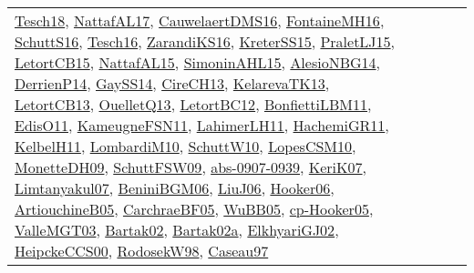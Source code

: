 {\begin{longtable}{lp{3cm}>{\raggedright}p{6cm}>{\raggedright}p{6cm}p{8cm}}
\href{papers/Tesch18.pdf}{Tesch18}\cite{Tesch18}, \href{articles/NattafAL17.pdf}{NattafAL17}\cite{NattafAL17}, \href{papers/CauwelaertDMS16.pdf}{CauwelaertDMS16}\cite{CauwelaertDMS16}, \href{papers/FontaineMH16.pdf}{FontaineMH16}\cite{FontaineMH16}, \href{papers/SchuttS16.pdf}{SchuttS16}\cite{SchuttS16}, \href{papers/Tesch16.pdf}{Tesch16}\cite{Tesch16}, \href{articles/ZarandiKS16.pdf}{ZarandiKS16}\cite{ZarandiKS16}, \href{papers/KreterSS15.pdf}{KreterSS15}\cite{KreterSS15}, \href{papers/PraletLJ15.pdf}{PraletLJ15}\cite{PraletLJ15}, \href{articles/LetortCB15.pdf}{LetortCB15}\cite{LetortCB15}, \href{articles/NattafAL15.pdf}{NattafAL15}\cite{NattafAL15}, \href{articles/SimoninAHL15.pdf}{SimoninAHL15}\cite{SimoninAHL15}, \href{papers/AlesioNBG14.pdf}{AlesioNBG14}\cite{AlesioNBG14}, \href{papers/DerrienP14.pdf}{DerrienP14}\cite{DerrienP14}, \href{papers/GaySS14.pdf}{GaySS14}\cite{GaySS14}, \href{papers/CireCH13.pdf}{CireCH13}\cite{CireCH13}, \href{papers/KelarevaTK13.pdf}{KelarevaTK13}\cite{KelarevaTK13}, \href{papers/LetortCB13.pdf}{LetortCB13}\cite{LetortCB13}, \href{papers/OuelletQ13.pdf}{OuelletQ13}\cite{OuelletQ13}, \href{papers/LetortBC12.pdf}{LetortBC12}\cite{LetortBC12}, \href{papers/BonfiettiLBM11.pdf}{BonfiettiLBM11}\cite{BonfiettiLBM11}, \href{papers/EdisO11.pdf}{EdisO11}\cite{EdisO11}, \href{papers/KameugneFSN11.pdf}{KameugneFSN11}\cite{KameugneFSN11}, \href{papers/LahimerLH11.pdf}{LahimerLH11}\cite{LahimerLH11}, \href{articles/HachemiGR11.pdf}{HachemiGR11}\cite{HachemiGR11}, \href{articles/KelbelH11.pdf}{KelbelH11}\cite{KelbelH11}, \href{papers/LombardiM10.pdf}{LombardiM10}\cite{LombardiM10}, \href{papers/SchuttW10.pdf}{SchuttW10}\cite{SchuttW10}, \href{articles/LopesCSM10.pdf}{LopesCSM10}\cite{LopesCSM10}, \href{papers/MonetteDH09.pdf}{MonetteDH09}\cite{MonetteDH09}, \href{papers/SchuttFSW09.pdf}{SchuttFSW09}\cite{SchuttFSW09}, \href{articles/abs-0907-0939.pdf}{abs-0907-0939}\cite{abs-0907-0939}, \href{papers/KeriK07.pdf}{KeriK07}\cite{KeriK07}, \href{papers/Limtanyakul07.pdf}{Limtanyakul07}\cite{Limtanyakul07}, \href{papers/BeniniBGM06.pdf}{BeniniBGM06}\cite{BeniniBGM06}, \href{papers/LiuJ06.pdf}{LiuJ06}\cite{LiuJ06}, \href{articles/Hooker06.pdf}{Hooker06}\cite{Hooker06}, \href{papers/ArtiouchineB05.pdf}{ArtiouchineB05}\cite{ArtiouchineB05}, \href{papers/CarchraeBF05.pdf}{CarchraeBF05}\cite{CarchraeBF05}, \href{papers/WuBB05.pdf}{WuBB05}\cite{WuBB05}, \href{papers/cp-Hooker05.pdf}{cp-Hooker05}\cite{cp-Hooker05}, \href{papers/ValleMGT03.pdf}{ValleMGT03}\cite{ValleMGT03}, \href{papers/Bartak02.pdf}{Bartak02}\cite{Bartak02}, \href{papers/Bartak02a.pdf}{Bartak02a}\cite{Bartak02a}, \href{papers/ElkhyariGJ02.pdf}{ElkhyariGJ02}\cite{ElkhyariGJ02}, \href{articles/HeipckeCCS00.pdf}{HeipckeCCS00}\cite{HeipckeCCS00}, \href{papers/RodosekW98.pdf}{RodosekW98}\cite{RodosekW98}, \href{papers/Caseau97.pdf}{Caseau97}\cite{Caseau97}\\

\end{longtable}}
